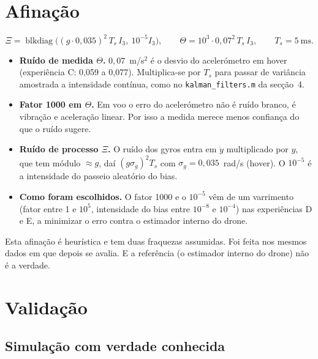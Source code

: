 \documentclass[10pt,a4paper]{article}
\newcommand{\code}[1]{\texttt{#1}}
\begin{document}
\section{Afina\c{c}\~ao}

\[
\Xi = \operatorname{blkdiag}\!\big((g\cdot 0{,}035)^2\,T_s\,I_3,\ 10^{-5} I_3\big),\qquad
\Theta = 10^{3}\cdot 0{,}07^2\,T_s\,I_3,\qquad T_s = 5~\text{ms}.
\]
\begin{itemize}
  \item \textbf{Ru\'ido de medida $\Theta$.} $0{,}07$~m/s$^2$ \'e o desvio do aceler\'ometro em hover (experi\^encia C: 0,059 a 0,077). Multiplica-se por $T_s$ para passar de vari\^ancia amostrada a intensidade cont\'inua, como no \code{kalman\_filters.m} da sec\c{c}\~ao~4.
  \item \textbf{Fator 1000 em $\Theta$.} Em voo o erro do aceler\'ometro n\~ao \'e ru\'ido branco, \'e vibra\c{c}\~ao e acelera\c{c}\~ao linear. Por isso a medida merece menos confian\c{c}a do que o ru\'ido sugere.
  \item \textbf{Ru\'ido de processo $\Xi$.} O ru\'ido dos gyros entra em $\dot y$ multiplicado por $y$, que tem m\'odulo $\approx g$, da\'i $(g\sigma_g)^2 T_s$ com $\sigma_g = 0{,}035$~rad/s (hover). O $10^{-5}$ \'e a intensidade do passeio aleat\'orio do bias.
  \item \textbf{Como foram escolhidos.} O fator 1000 e o $10^{-5}$ v\^em de um varrimento (fator entre 1 e $10^5$, intensidade do bias entre $10^{-8}$ e $10^{-4}$) nas experi\^encias D e E, a minimizar o erro contra o estimador interno do drone.
\end{itemize}

\begin{caveat}
Esta afina\c{c}\~ao \'e heur\'istica e tem duas fraquezas assumidas.
Foi feita nos mesmos dados em que depois se avalia.
E a refer\^encia (o estimador interno do drone) n\~ao \'e a verdade.
\end{caveat}

\section{Valida\c{c}\~ao}

\subsection{Simula\c{c}\~ao com verdade conhecida}
\end{document}
